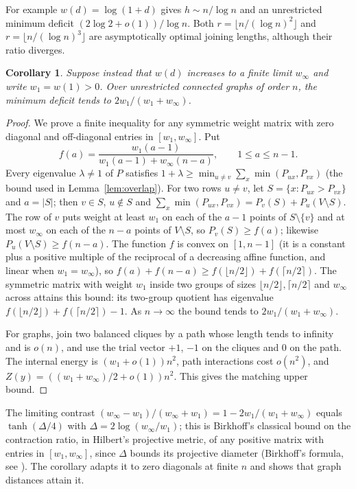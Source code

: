 \documentclass[11pt,a4paper]{article}
\newtheorem{corollary}[theorem]{Corollary}
\theoremstyle{definition}
\begin{document}
For example $w(d)=\log(1+d)$ gives $h\sim n/\log n$ and an unrestricted minimum deficit $(2\log2+o(1))/\log n$. Both $r=\lfloor n/(\log n)^2\rfloor$ and $r=\lfloor n/(\log n)^3\rfloor$ are asymptotically optimal joining lengths, although their ratio diverges.

\begin{corollary}\label{cor:bounded}
Suppose instead that $w(d)$ increases to a finite limit $w_\infty$ and write $w_1=w(1)>0$. Over unrestricted connected graphs of order $n$, the minimum deficit tends to $2w_1/(w_1+w_\infty)$.
\end{corollary}
\begin{proof}
We prove a finite inequality for any symmetric weight matrix with zero diagonal and off-diagonal entries in $[w_1,w_\infty]$. Put
\[
 f(a)=\frac{w_1(a-1)}{w_1(a-1)+w_\infty(n-a)},\qquad 1\le a\le n-1 .
\]
Every eigenvalue $\lambda\ne1$ of $P$ satisfies $1+\lambda\ge\min_{u\ne v}\sum_x\min(P_{ux},P_{vx})$ (the bound used in Lemma~\ref{lem:overlap}). For two rows $u\ne v$, let $S=\{x:P_{ux}>P_{vx}\}$ and $a=|S|$; then $v\in S$, $u\notin S$ and $\sum_x\min(P_{ux},P_{vx})=P_v(S)+P_u(V\setminus S)$. The row of $v$ puts weight at least $w_1$ on each of the $a-1$ points of $S\setminus\{v\}$ and at most $w_\infty$ on each of the $n-a$ points of $V\setminus S$, so $P_v(S)\ge f(a)$; likewise $P_u(V\setminus S)\ge f(n-a)$. The function $f$ is convex on $[1,n-1]$ (it is a constant plus a positive multiple of the reciprocal of a decreasing affine function, and linear when $w_1=w_\infty$), so $f(a)+f(n-a)\ge f(\lfloor n/2\rfloor)+f(\lceil n/2\rceil)$. The symmetric matrix with weight $w_1$ inside two groups of sizes $\lfloor n/2\rfloor,\lceil n/2\rceil$ and $w_\infty$ across attains this bound: its two-group quotient has eigenvalue $f(\lfloor n/2\rfloor)+f(\lceil n/2\rceil)-1$. As $n\to\infty$ the bound tends to $2w_1/(w_1+w_\infty)$.

For graphs, join two balanced cliques by a path whose length tends to infinity and is $o(n)$, and use the trial vector $+1$, $-1$ on the cliques and $0$ on the path. The internal energy is $(w_1+o(1))n^2$, path interactions cost $o(n^2)$, and $Z(y)=((w_1+w_\infty)/2+o(1))n^2$. This gives the matching upper bound.
\end{proof}
The limiting contrast $(w_\infty-w_1)/(w_\infty+w_1)=1-2w_1/(w_1+w_\infty)$ equals $\tanh(\Delta/4)$ with $\Delta=2\log(w_\infty/w_1)$; this is Birkhoff's classical bound on the contraction ratio, in Hilbert's projective metric, of any positive matrix with entries in $[w_1,w_\infty]$, since $\Delta$ bounds its projective diameter (Birkhoff's formula, see \cite[Theorem~5.6]{gq}). The corollary adapts it to zero diagonals at finite $n$ and shows that graph distances attain it.
\end{document}
